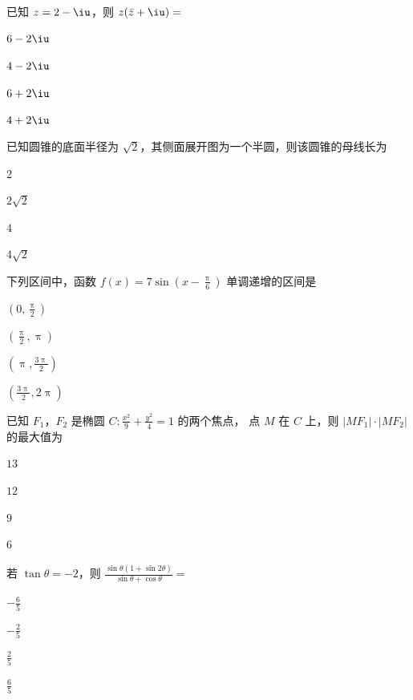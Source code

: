 \documentclass{exam-zh}
\begin{document}
\begin{question}
  已知 $z = 2 - \iu$，则 $z (\bar{z} + \iu) = $ \paren
  \begin{choices}
    \item $6 - 2\iu$
    \item $4 - 2\iu$
    \item $6 + 2\iu$
    \item $4 + 2\iu$
  \end{choices}
\end{question}

\begin{question}
  已知圆锥的底面半径为 $\sqrt{2}$，其侧面展开图为一个半圆，则该圆锥的母线长为 \paren
  \begin{choices}
    \item $2$
    \item $2 \sqrt{2}$
    \item $4$
    \item $4 \sqrt{2}$
  \end{choices}
\end{question}

\begin{question}
  下列区间中，函数 $f(x) = 7 \sin \left( x - \frac{\uppi}{6} \right)$ 单调递增的区间是 \paren
  \begin{choices}
    \item $\left( 0               , \frac{\uppi}{2}  \right)$
    \item $\left( \frac{\uppi}{2} , \uppi            \right)$
    \item $\left( \uppi           , \frac{3\uppi}{2} \right)$
    \item $\left( \frac{3\uppi}{2}, 2\uppi           \right)$
  \end{choices}
\end{question}

\begin{question}
  已知 $F_1$，$F_2$ 是椭圆 $C \colon \frac{x^2}{9} + \frac{y^2}{4} = 1$ 的两个焦点，
  点 $M$ 在 $C$ 上，则 $|M F_1| \cdot |M F_2|$ 的最大值为 \paren
  \begin{choices}
    \item $13$
    \item $12$
    \item $9$
    \item $6$
  \end{choices}
\end{question}

\begin{question}
  若 $\tan\theta = -2$，则 $\frac{\sin\theta (1 + \sin 2\theta)}{\sin\theta + \cos\theta} = $ \paren
  \begin{choices}
    \item $-\frac{6}{5}$
    \item $-\frac{2}{5}$
    \item $\frac{2}{5}$
    \item $\frac{6}{5}$
  \end{choices}
\end{question}
\end{document}
